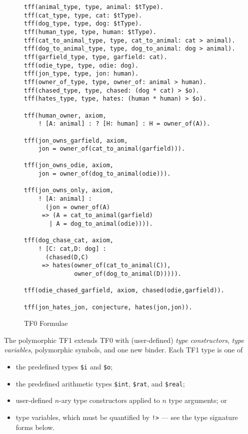 \begin{figure}[htbp]
\begin{lstlisting}[language=tptp]
tff(animal_type, type, animal: $tType).
tff(cat_type, type, cat: $tType).
tff(dog_type, type, dog: $tType).
tff(human_type, type, human: $tType).
tff(cat_to_animal_type, type, cat_to_animal: cat > animal).
tff(dog_to_animal_type, type, dog_to_animal: dog > animal).
tff(garfield_type, type, garfield: cat).
tff(odie_type, type, odie: dog).
tff(jon_type, type, jon: human).
tff(owner_of_type, type, owner_of: animal > human).
tff(chased_type, type, chased: (dog * cat) > $o).
tff(hates_type, type, hates: (human * human) > $o).

tff(human_owner, axiom,
    ! [A: animal] : ? [H: human] : H = owner_of(A)).

tff(jon_owns_garfield, axiom,
    jon = owner_of(cat_to_animal(garfield))).

tff(jon_owns_odie, axiom,
    jon = owner_of(dog_to_animal(odie))).

tff(jon_owns_only, axiom,
    ! [A: animal] :
      (jon = owner_of(A)
     => (A = cat_to_animal(garfield)
       | A = dog_to_animal(odie)))).

tff(dog_chase_cat, axiom,
    ! [C: cat,D: dog] :
      (chased(D,C)
     => hates(owner_of(cat_to_animal(C)),
              owner_of(dog_to_animal(D))))).

tff(odie_chased_garfield, axiom, chased(odie,garfield)).

tff(jon_hates_jon, conjecture, hates(jon,jon)).
\end{lstlisting}
\caption{TF0 Formulae}
\label{fig:tfx/TF0Example}
\end{figure}

The polymorphic TF1 extends TF0 with (user-defined) {\em type constructors}, 
{\em type variables}, polymorphic symbols, and one new binder.
Each TF1 type is one of
\begin{itemize}
\item the predefined types \lstinline'$i' and \lstinline'$o';
\item the predefined arithmetic types \lstinline'$int', \lstinline'$rat', and 
      \lstinline'$real';
\item user-defined $n$-ary type constructors applied to $n$ type arguments; or
\item type variables, which must be quantified by \lstinline'!>' --- see the type
      signature forms below.
\end{itemize}

